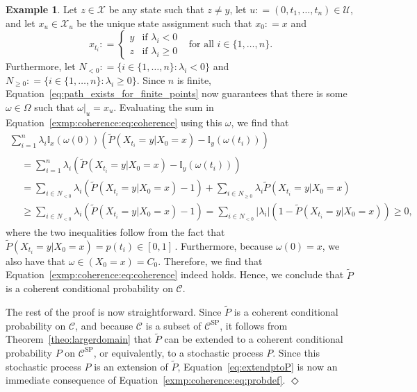 \documentclass[10pt,a4paper]{paper}
\theoremstyle{definition}
\newtheorem{exmp}{Example}
\newcommand{\states}{\mathcal{X}}
\newcommand{\ind}[1]{\mathbb{I}_{#1}}
\newcommand{\abs}[1]{\left\vert #1 \right\vert}
\newcommand{\coloneqq}{:\!=}
\newcommand{\exampleend}{\hfill$\Diamond$}
\begin{document}
\begin{exmp}
Let $z\in\states$ be any state such that $z\neq y$, let $u\coloneqq(0,t_1,\ldots,t_n)\in\mathcal{U}$, and let $x_u\in\states_u$ be the unique state assignment such that $x_{0}\coloneqq x$ and
\begin{equation*}
x_{t_i}\coloneqq
\begin{cases}
y & \text{if $\lambda_i<0$} \\
z & \text{if $\lambda_i\geq0$}
\end{cases}
~~\text{ for all $i\in\{1,\ldots,n\}$.}
\end{equation*}
Furthermore, let $N_{<0}\coloneqq\{i\in\{1,\dots,n\}\colon \lambda_i<0\}$ and $N_{\geq0}\coloneqq\{i\in\{1,\dots,n\}\colon \lambda_i\geq0\}$.
Since $n$ is finite, Equation~\eqref{eq:path_exists_for_finite_points} now guarantees that there is some $\omega\in\Omega$ such that $\omega\vert_{u}=x_u$. Evaluating the sum in Equation~\eqref{exmp:coherence:eq:coherence} using this $\omega$, we find that
\begin{multline*}
 \sum_{i=1}^n \lambda_{i}\ind{x}(\omega(0))\left(\tilde{P}(X_{t_i}=y\vert X_0=x) - \ind{y}(\omega(t_i))\right)\\[-4pt]
 \begin{aligned}
 &= \sum_{i=1}^n \lambda_{i}\left(\tilde{P}(X_{t_i}=y\vert X_0=x) - \ind{y}(\omega(t_i))\right) \\
 &= \sum_{i\in N_{<0}}\lambda_{i}\left(\tilde{P}(X_{t_i}=y\vert X_0=x) - 1\right) + \sum_{i\in N_{\geq0}}\lambda_{i}\tilde{P}(X_{t_i}=y\vert X_0=x) \\
 &\geq \sum_{i\in N_{<0}}\lambda_{i}\left(\tilde{P}(X_{t_i}=y\vert X_0=x) - 1\right) = \sum_{i\in N_{<0}}\abs{\lambda_{i}}\left(1 - \tilde{P}(X_{t_i}=y\vert X_0=x)\right) \geq 0,
 \end{aligned}
\end{multline*}
where the two inequalities follow from the fact that $\tilde{P}(X_{t_i}=y\vert X_0=x)=p(t_i)\in [0,1]$\,.
Furthermore, because $\omega(0)=x$, we also have that $\omega\in (X_0=x)=C_0$. Therefore, we find that Equation~\eqref{exmp:coherence:eq:coherence} indeed holds. Hence, we conclude that $\tilde{P}$ is a coherent conditional probability on $\mathcal{C}$.

The rest of the proof is now straightforward. Since $\tilde{P}$ is a coherent conditional probability on $\mathcal{C}$, and because $\mathcal{C}$ is a subset of $\mathcal{C}^{\mathrm{SP}}$, it follows from Theorem~\ref{theo:largerdomain} that $\tilde{P}$ can be extended to a coherent conditional probability $P$ on $\mathcal{C}^{\mathrm{SP}}$, or equivalently, to a stochastic process $P$. Since this stochastic process $P$ is an extension of $\tilde{P}$, Equation~\eqref{eq:extendptoP} is now an immediate consequence of Equation~\eqref{exmp:coherence:eq:probdef}.
\exampleend
\end{exmp}
\end{document}
